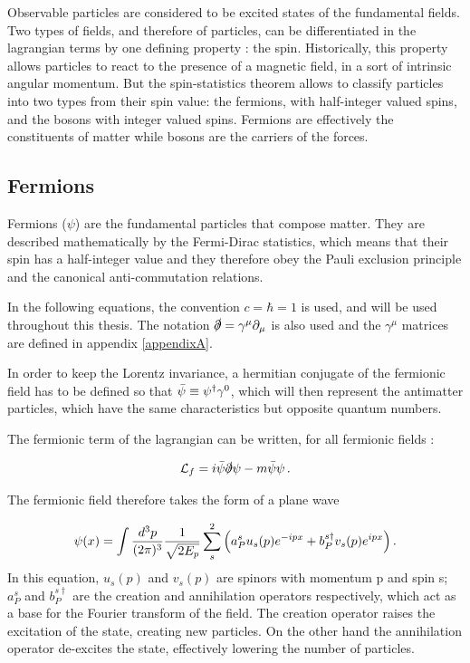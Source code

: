 Observable particles are considered to be excited states of the fundamental fields. Two types of fields, and therefore of particles, can be differentiated in the lagrangian terms by one defining property : the spin. Historically, this property allows particles to react to the presence of a magnetic field, in a sort of intrinsic angular momentum. But the spin-statistics theorem allows to classify particles into two types from their spin value: the fermions, with half-integer valued spins, and the bosons with integer valued spins. Fermions are effectively the constituents of matter while bosons are the carriers of the forces.

\subsection{Fermions}

Fermions ($\psi$) are the fundamental particles that compose matter. They are described mathematically by the Fermi-Dirac statistics, which means that their spin has a half-integer value and they therefore obey the Pauli exclusion principle and the canonical anti-commutation relations.

In the following equations, the convention $c = \hbar = 1$ is used, and will be used throughout this thesis. The notation $\slashed{\partial} = \gamma^{\mu}\partial_{\mu}$ is also used and the $\gamma^{\mu}$ matrices are defined in appendix \ref{appendixA}. \newline

In order to keep the Lorentz invariance, a hermitian conjugate of the fermionic field has to be defined so that $\Bar{\psi} \equiv \psi^{\dagger}\gamma^0$, which will then represent the antimatter particles, which have the same characteristics but opposite quantum numbers.\newline

The fermionic term of the lagrangian can be written, for all fermionic fields :

\begin{equation}
    \Lagr_f = i\Bar{\psi}\slashed{\partial}\psi - m\Bar{\psi}\psi \mend
    \label{eq:free_fermion}
\end{equation}

The fermionic field therefore takes the form of a plane wave 

\begin{equation}
    \psi(x) = \int \frac{d^3 p}{(2\pi)^3} \frac{1}{\sqrt{2E_p}} \sum^{2}_{s} \Big( a^{s}_{P} u_s (p)e^{-ipx} + b^{s\dagger}_P v_s (p)e^{ipx} \Big) \mend
\end{equation}
In this equation, $u_s (p)$ and $v_s (p)$ are spinors with momentum p and spin s; $a^{s}_P$ and $b^{s\dagger}_P$ are the creation and annihilation operators respectively, which act as a base for the Fourier transform of the field. The creation operator raises the excitation of the state, creating new particles. On the other hand the annihilation operator de-excites the state, effectively lowering the number of particles.

